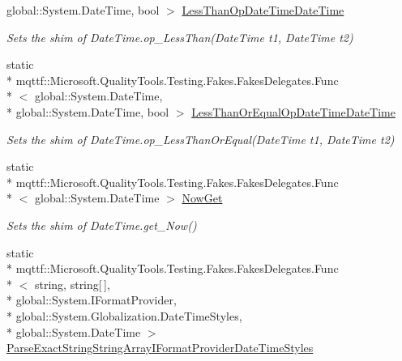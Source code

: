\begin{DoxyCompactItemize}
global\-::\-System.\-Date\-Time, bool $>$ \hyperlink{class_system_1_1_fakes_1_1_shim_date_time_aac6b6d968dd77b26a764bcd8eebaee5f}{Less\-Than\-Op\-Date\-Time\-Date\-Time}
\begin{DoxyCompactList}\small\item\em Sets the shim of Date\-Time.\-op\-\_\-\-Less\-Than(\-Date\-Time t1, Date\-Time t2)\end{DoxyCompactList}\item 
static \\*
mqttf\-::\-Microsoft.\-Quality\-Tools.\-Testing.\-Fakes.\-Fakes\-Delegates.\-Func\\*
$<$ global\-::\-System.\-Date\-Time, \\*
global\-::\-System.\-Date\-Time, bool $>$ \hyperlink{class_system_1_1_fakes_1_1_shim_date_time_a83e3622064826c043e27dde47c2d5502}{Less\-Than\-Or\-Equal\-Op\-Date\-Time\-Date\-Time}
\begin{DoxyCompactList}\small\item\em Sets the shim of Date\-Time.\-op\-\_\-\-Less\-Than\-Or\-Equal(\-Date\-Time t1, Date\-Time t2)\end{DoxyCompactList}\item 
static \\*
mqttf\-::\-Microsoft.\-Quality\-Tools.\-Testing.\-Fakes.\-Fakes\-Delegates.\-Func\\*
$<$ global\-::\-System.\-Date\-Time $>$ \hyperlink{class_system_1_1_fakes_1_1_shim_date_time_a6ce9fabaa922443b0bc2197082a9ff7e}{Now\-Get}
\begin{DoxyCompactList}\small\item\em Sets the shim of Date\-Time.\-get\-\_\-\-Now()\end{DoxyCompactList}\item 
static \\*
mqttf\-::\-Microsoft.\-Quality\-Tools.\-Testing.\-Fakes.\-Fakes\-Delegates.\-Func\\*
$<$ string, string\mbox{[}$\,$\mbox{]}, \\*
global\-::\-System.\-I\-Format\-Provider, \\*
global\-::\-System.\-Globalization.\-Date\-Time\-Styles, \\*
global\-::\-System.\-Date\-Time $>$ \hyperlink{class_system_1_1_fakes_1_1_shim_date_time_a864cc9c520e47c34eda4d961352a8f4a}{Parse\-Exact\-String\-String\-Array\-I\-Format\-Provider\-Date\-Time\-Styles}

\end{DoxyCompactItemize}
